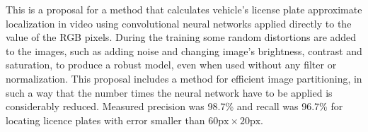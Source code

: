 
This is a proposal for a method that calculates vehicle's license plate
approximate
localization in video using convolutional neural networks applied directly to
the value of the RGB pixels. During the training some random distortions are
added to the images, such as adding noise and changing image's brightness,
contrast and saturation, to produce a robust model, even when used without any
filter or normalization. This proposal includes a method for efficient image
partitioning, in such a way that the number times the neural network have to be
applied is considerably reduced. Measured precision was 98.7\% and recall was
96.7\% for locating licence plates with error smaller than $60\text{px} \times
20\text{px}$.
